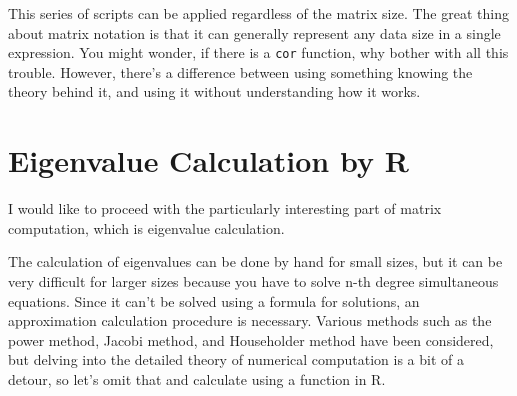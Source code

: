 \documentclass{ltjsbook}
\begin{document}









This series of scripts can be applied regardless of the matrix size. The great thing about matrix notation is that it can generally represent any data size in a single expression.
You might wonder, if there is a \texttt{cor} function, why bother with all this trouble. However, there's a difference between using something knowing the theory behind it, and using it without understanding how it works.

\section{Eigenvalue Calculation by R}
I would like to proceed with the particularly interesting part of matrix computation, which is eigenvalue calculation.

The calculation of eigenvalues can be done by hand for small sizes, but it can be very difficult for larger sizes because you have to solve n-th degree simultaneous equations. Since it can't be solved using a formula for solutions, an approximation calculation procedure is necessary. Various methods such as the power method, Jacobi method, and Householder method have been considered, but delving into the detailed theory of numerical computation is a bit of a detour, so let's omit that and calculate using a function in R.
\end{document}

